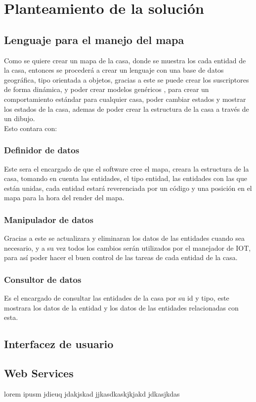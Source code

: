 \section{Planteamiento de la solución}
\subsection{Lenguaje para el manejo del mapa}
Como se quiere crear un mapa de la casa, donde se muestra los cada entidad de la casa, entonces se procederá a crear un lenguaje con una base de datos geográfica, tipo orientada a objetos, gracias a este se puede crear los suscriptores de forma dinámica, y poder crear modelos genéricos , para crear un comportamiento estándar para cualquier casa, poder cambiar estados y mostrar los estados de la casa, ademas de poder crear la estructura de la casa a través de un dibujo.\\
Esto contara con:
\subsubsection{Definidor de datos}
Este sera el encargado de que el software cree el mapa, creara la estructura de la casa, tomando en cuenta las entidades, el tipo entidad, las entidades con las que están unidas, cada entidad estará reverenciada por un código y una posición en el mapa para la hora del render del mapa.
\subsubsection{Manipulador de datos}
Gracias a este se actualizara y eliminaran los datos de las entidades cuando sea necesario, y a su vez todos los cambios serán utilizados por el manejador de IOT, para así poder hacer el buen control de las tareas de cada entidad de la casa.
\subsubsection{Consultor de datos}
Es el encargado de consultar las entidades de la casa por su id y tipo, este mostrara los datos de la entidad  y los datos de las entidades relacionadas con esta.

\subsection{Interfacez de usuario}
\subsection{Web Services}
lorem ipusm jdieuq jdakjskad jjkasdkaskjkjakd jdkasjkdas
